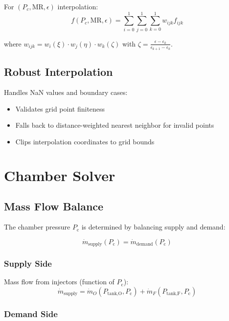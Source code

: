 \documentclass[12pt,a4paper]{article}
\newcommand{\mdot}{\dot{m}}
\newcommand{\Pc}{P_{\text{c}}}
\newcommand{\PtankO}{P_{\text{tank,O}}}
\newcommand{\PtankF}{P_{\text{tank,F}}}
\newcommand{\MR}{\text{MR}}
\newcommand{\eps}{\epsilon}
\begin{document}
For $(P_c, \MR, \eps)$ interpolation:
\begin{equation}
f(P_c, \MR, \eps) = \sum_{i=0}^1 \sum_{j=0}^1 \sum_{k=0}^1 w_{ijk} f_{ijk}
\end{equation}

where $w_{ijk} = w_i(\xi) \cdot w_j(\eta) \cdot w_k(\zeta)$ with $\zeta = \frac{\eps - \eps_k}{\eps_{k+1} - \eps_k}$.

\subsection{Robust Interpolation}

Handles NaN values and boundary cases:
\begin{itemize}
    \item Validates grid point finiteness
    \item Falls back to distance-weighted nearest neighbor for invalid points
    \item Clips interpolation coordinates to grid bounds
\end{itemize}

\section{Chamber Solver}

\subsection{Mass Flow Balance}

The chamber pressure $\Pc$ is determined by balancing supply and demand:

\begin{equation}
\mdot_{\text{supply}}(\Pc) = \mdot_{\text{demand}}(\Pc)
\end{equation}

\subsubsection{Supply Side}

Mass flow from injectors (function of $\Pc$):
\begin{equation}
\mdot_{\text{supply}} = \mdot_O(\PtankO, \Pc) + \mdot_F(\PtankF, \Pc)
\end{equation}

\subsubsection{Demand Side}
\end{document}
